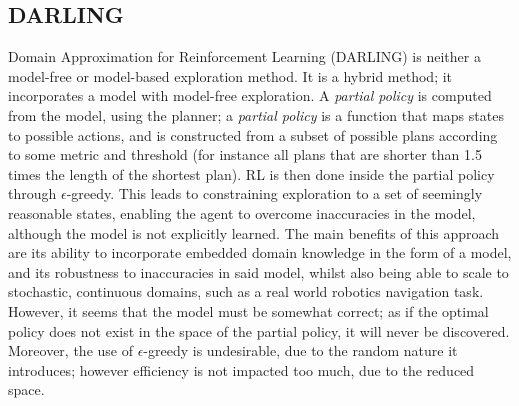 \subsection{DARLING}
Domain Approximation for Reinforcement Learning (DARLING) \cite{AIJ16-leonetti} is neither a model-free or model-based exploration method. It is a hybrid method; it incorporates a model with model-free exploration. A \textit{partial policy} is computed from the model, using the planner; a \textit{partial policy} is a function that maps states to possible actions, and is constructed from a subset of possible plans according to some metric and threshold (for instance all plans that are shorter than 1.5 times the length of the shortest plan). RL is then done inside the partial policy through $\epsilon$-greedy. This leads to constraining exploration to a set of seemingly reasonable states, enabling the agent to overcome inaccuracies in the model, although the model is not explicitly learned. The main benefits of this approach are its ability to incorporate embedded domain knowledge in the form of a model, and its robustness to inaccuracies in said model, whilst also being able to scale to stochastic, continuous domains, such as a real world robotics navigation task. However, it seems that the model must be somewhat correct; as if the optimal policy does not exist in the space of the partial policy, it will never be discovered. Moreover, the use of $\epsilon$-greedy is undesirable, due to the random nature it introduces; however efficiency is not impacted too much, due to the reduced space.


